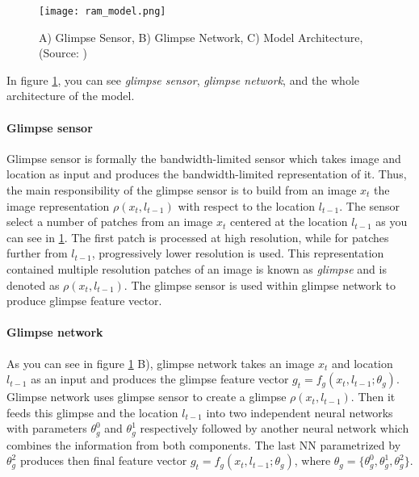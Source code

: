 \begin{figure}[H]
	\texttt{[image: ram\_model.png]}
	\caption{
		A) Glimpse Sensor,
		B) Glimpse Network,
		C) Model Architecture,
		(Source: \cite{DBLP:journals/corr/MnihHGK14})
	}
	\label{img:ram_model}
\end{figure}

In figure \ref{img:ram_model}, you can see
\emph{glimpse sensor}, \emph{glimpse network}, and the whole architecture
of the model.

\paragraph{Glimpse sensor} Glimpse sensor is formally the bandwidth-limited sensor
which takes image and location as input and produces the bandwidth-limited representation of it.
Thus, the main responsibility of the glimpse sensor
is to build from an image $x_t$ the image representation $\rho(x_t, l_{t-1})$
with respect to the location $l_{t-1}$. The sensor select a number of patches
 from an image $x_t$ centered at the location $l_{t-1}$ as you can see in \ref{img:ram_model}.
 The first patch is processed at high resolution, while for patches further
 from $l_{t-1}$, progressively lower resolution is used. This representation contained
 multiple resolution patches
 of an image is known as \emph{glimpse} and is denoted as $\rho(x_t, l_{t-1})$. \cite{Larochelle2010}
 The glimpse sensor is used within glimpse network to produce
  glimpse feature vector.



%
%
%


\paragraph{Glimpse network} As you can see in figure \ref{img:ram_model} B),
glimpse network takes an image $x_t$ and
location $l_{t-1}$ as an input and produces the glimpse feature vector
$g_t = f_g (x_t, l_{t-1}; \theta_g)$. Glimpse network uses glimpse sensor to
create a glimpse $\rho(x_t, l_{t-1})$. Then it feeds this glimpse and the location
$l_{t-1}$ into two independent neural networks with parameters $\theta_g^0$ and $\theta_g^1$
respectively followed by another neural network which combines the information
from both components. The last NN parametrized by $\theta_g^2$ produces then
final feature vector $g_t = f_g (x_t, l_{t-1}; \theta_g)$,
where $\theta_g = \{\theta_g^0, \theta_g^1, \theta_g^2\}$.

